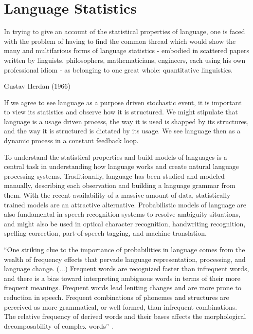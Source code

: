 \chapter{Language Statistics}\label{sec:lang_stat}
\epigraph{In trying to give an account of the statistical properties of language,
one is faced with the problem of having to find the common thread which would
show the many and multifarious forms of language statistics - embodied in scattered
papers written by linguists, philosophers, mathematicians, engineers, each using his 
own professional idiom - as belonging to one great whole: quantitative linguistics.}{Gustav Herdan (1966)}

% 
% 
%
If we agree to see language as a purpose driven stochastic event, 
it is important to view its statistics and observe how it is structured. 
We might stipulate that language is a usage driven process, 
the way it is used is shapped by its structures,
and the way it is structured is dictated by its usage. 
We see language then as a dynamic process in a constant feedback loop.

To understand the statistical properties and build models of languages is a central task in understanding
how language works and create natural language processing systems. Traditionally, language has
been studied and modeled manually, describing each observation and building a language grammar from them.
With the recent availability of a massive amount of data, statistically trained models are an attractive
alternative. Probabilistic models of language are also fundamental in speech recognition systems to
resolve ambiguity situations, and might also be used in optical character recognition, handwriting recognition,
spelling correction, part-of-speech tagging, and machine translation.


``One striking clue to the importance of probabilities in language comes
from the wealth of frequency effects that pervade language representation, processing, and language change.
(...) Frequent words are recognized faster than infrequent words, and there is a bias toward interpreting 
ambiguous words in terms of their more frequent meanings. Frequent words lead leniting changes and 
are more prone to reduction in speech. Frequent combinations of phonemes and structures are perceived as
more grammatical, or well formed, than infrequent combinations. 
The relative frequency of derived words and their bases affects the morphological decomposability of complex words'' 
\citep{bod2003}.

